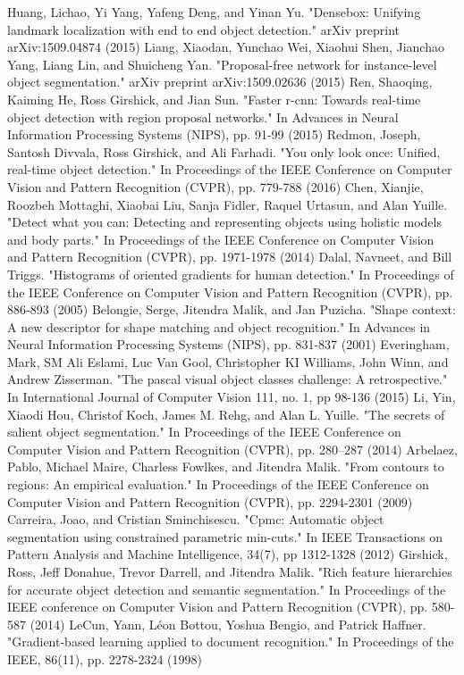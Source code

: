 \begin{thebibliography}{}
% 
Huang, Lichao, Yi Yang, Yafeng Deng, and Yinan Yu. "Densebox: Unifying landmark localization with end to end object detection." arXiv preprint arXiv:1509.04874 (2015)
Liang, Xiaodan, Yunchao Wei, Xiaohui Shen, Jianchao Yang, Liang Lin, and Shuicheng Yan. "Proposal-free network for instance-level object segmentation." arXiv preprint arXiv:1509.02636 (2015)
Ren, Shaoqing, Kaiming He, Ross Girshick, and Jian Sun. "Faster r-cnn: Towards real-time object detection with region proposal networks." In Advances in Neural Information Processing Systems (NIPS), pp. 91-99 (2015)
Redmon, Joseph, Santosh Divvala, Ross Girshick, and Ali Farhadi. "You only look once: Unified, real-time object detection." In Proceedings of the IEEE Conference on Computer Vision and Pattern Recognition (CVPR), pp. 779-788 (2016)
%
Chen, Xianjie, Roozbeh Mottaghi, Xiaobai Liu, Sanja Fidler, Raquel Urtasun, and Alan Yuille. "Detect what you can: Detecting and representing objects using holistic models and body parts." In Proceedings of the IEEE Conference on Computer Vision and Pattern Recognition (CVPR), pp. 1971-1978 (2014)
%
Dalal, Navneet, and Bill Triggs. "Histograms of oriented gradients for human detection." In Proceedings of the IEEE Conference on Computer Vision and Pattern Recognition (CVPR), pp. 886-893 (2005)
Belongie, Serge, Jitendra Malik, and Jan Puzicha. "Shape context: A new descriptor for shape matching and object recognition." In Advances in Neural Information Processing Systems (NIPS), pp. 831-837 (2001)
Everingham, Mark, SM Ali Eslami, Luc Van Gool, Christopher KI Williams, John Winn, and Andrew Zisserman. "The pascal visual object classes challenge: A retrospective." In International Journal of Computer Vision 111, no. 1, pp 98-136 (2015)
Li, Yin, Xiaodi Hou, Christof Koch, James M. Rehg, and Alan L. Yuille. "The secrets of salient object segmentation." In Proceedings of the IEEE Conference on Computer Vision and Pattern Recognition (CVPR), pp. 280–287 (2014)
%
Arbelaez, Pablo, Michael Maire, Charless Fowlkes, and Jitendra Malik. "From contours to regions: An empirical evaluation." In Proceedings of the IEEE Conference on Computer Vision and Pattern Recognition (CVPR), pp. 2294-2301 (2009)
Carreira, Joao, and Cristian Sminchisescu. "Cpmc: Automatic object segmentation using constrained parametric min-cuts." In IEEE Transactions on Pattern Analysis and Machine Intelligence, 34(7), pp 1312-1328 (2012)
Girshick, Ross, Jeff Donahue, Trevor Darrell, and Jitendra Malik. "Rich feature hierarchies for accurate object detection and semantic segmentation." In Proceedings of the IEEE conference on Computer Vision and Pattern Recognition (CVPR), pp. 580-587 (2014)
LeCun, Yann, Léon Bottou, Yoshua Bengio, and Patrick Haffner. "Gradient-based learning applied to document recognition." In Proceedings of the IEEE, 86(11), pp. 2278-2324 (1998)

\end{thebibliography}



